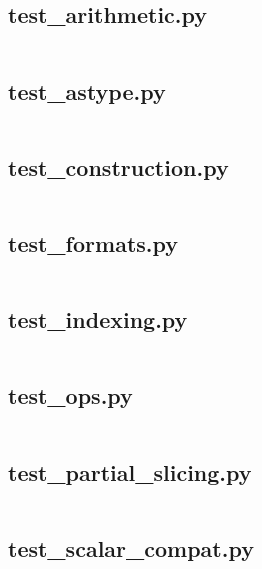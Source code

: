 \documentclass{article}
\begin{document}
\subsection{test\_arithmetic.py}
\inputminted{python}{/home/dufferzafar/dev/@clones/pandas/pandas/tests/indexes/timedeltas/test_arithmetic.py}
\newpage

\subsection{test\_astype.py}
\inputminted{python}{/home/dufferzafar/dev/@clones/pandas/pandas/tests/indexes/timedeltas/test_astype.py}
\newpage

\subsection{test\_construction.py}
\inputminted{python}{/home/dufferzafar/dev/@clones/pandas/pandas/tests/indexes/timedeltas/test_construction.py}
\newpage

\subsection{test\_formats.py}
\inputminted{python}{/home/dufferzafar/dev/@clones/pandas/pandas/tests/indexes/timedeltas/test_formats.py}
\newpage

\subsection{test\_indexing.py}
\inputminted{python}{/home/dufferzafar/dev/@clones/pandas/pandas/tests/indexes/timedeltas/test_indexing.py}
\newpage

\subsection{test\_ops.py}
\inputminted{python}{/home/dufferzafar/dev/@clones/pandas/pandas/tests/indexes/timedeltas/test_ops.py}
\newpage

\subsection{test\_partial\_slicing.py}
\inputminted{python}{/home/dufferzafar/dev/@clones/pandas/pandas/tests/indexes/timedeltas/test_partial_slicing.py}
\newpage

\subsection{test\_scalar\_compat.py}
\inputminted{python}{/home/dufferzafar/dev/@clones/pandas/pandas/tests/indexes/timedeltas/test_scalar_compat.py}
\newpage
\end{document}
